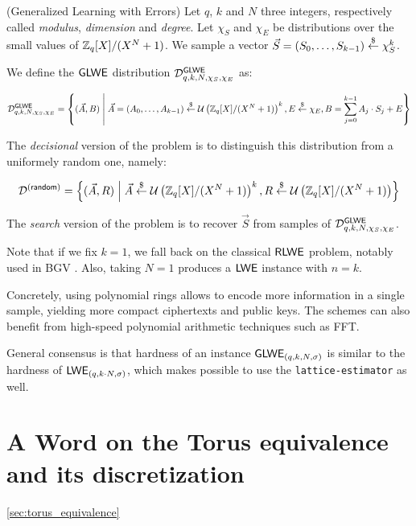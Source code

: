 \begin{definition}
	(Generalized Learning with Errors) Let $q$, $k$ and $N$ three integers, respectively called \textit{modulus}, \textit{dimension} and \textit{degree}. Let $\chi_S$ and $\chi_E$ be distributions over the small values of $\mathbb{Z}_q[X] / (X^N + 1)$. We sample a vector $\vec S = (S_0, \dots, S_{k-1}) \overset{\$}{\leftarrow} \chi_S^k$. 
	
	We define the $\textsf{GLWE}$ distribution $\mathcal{D}_{q, k, N, \chi_S, \chi_E}^{\textsf{GLWE}}$ as:
	
	\[
	\mathcal{D}_{q, k, N, \chi_S, \chi_E}^{\textsf{GLWE}} = \left \{ (\vec A, B) \;\middle|\; \vec A = (A_0, \dots, A_{k-1}) \overset{\$}{\leftarrow} \mathcal U \left ( \mathbb{Z}_q[X] / (X^N + 1) \right )^k, E \overset{\$}{\leftarrow} \chi_E, B = \sum_{j=0}^{k-1} A_j \cdot S_j + E \right \}
	\]
	
	The \textit{decisional} version of the problem is to distinguish this distribution from a uniformely random one, namely:
	
	\[
	\mathcal{D}^{(\textsf{random})} = \left \{(\vec A, R) \;\middle|\; \vec A \overset{\$}{\leftarrow} \mathcal U \left ( \mathbb{Z}_q[X] / (X^N + 1) \right )^k, R \overset{\$}{\leftarrow} \mathcal U \left ( \mathbb{Z}_q[X] / (X^N + 1) \right ) \right\}
	\]
	
	The \emph{search} version of the problem is to recover $\vec S$ from samples of $\mathcal{D}_{q, k , N, \chi_S, \chi_E}^{\textsf{GLWE}}$. 
	\label{def:GLWE}
	
\end{definition}

Note that if we fix $k = 1$, we fall back on the classical $\textsf{RLWE}$ problem, notably used in BGV \cite{bgv}. Also, taking $N=1$ produces a $\textsf{LWE}$ instance with $n = k$. 

Concretely, using polynomial rings allows to encode more information in a single sample, yielding more compact ciphertexts and public keys. The schemes can also benefit from high-speed polynomial arithmetic techniques such as FFT. 

General consensus is that hardness of an instance $\textsf{GLWE}_{(q, k, N, \sigma)}$ is similar to the hardness of $\textsf{LWE}_{(q, k \cdot N, \sigma)}$, which makes possible to use the \texttt{lattice-estimator} as well.








\section{A Word on the Torus equivalence and its discretization}
\ref{sec:torus_equivalence}


